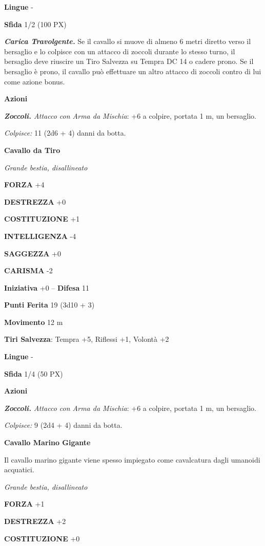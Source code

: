 \begin{multicols}{2}
\textbf{Lingue} -

\textbf{Sfida} 1/2 (100 PX)

\textit{\textbf{Carica Travolgente.}} Se il cavallo si muove di almeno 6 metri diretto verso il bersaglio e lo colpisce con un attacco di zoccoli durante lo stesso turno, il bersaglio deve riuscire un Tiro Salvezza su Tempra DC 14 o cadere prono. Se il bersaglio è prono, il cavallo può effettuare un altro attacco di zoccoli contro di lui come azione bonus.

\textbf{Azioni}

\textit{\textbf{Zoccoli.} Attacco con Arma da Mischia}: +6 a colpire, portata 1 m, un bersaglio.

\textit{Colpisce:} 11 (2d6 + 4) danni da botta.

\medskip\textbf{Cavallo da Tiro}

\textit{Grande bestia, disallineato}

\textbf{FORZA} +4

\textbf{DESTREZZA} +0

\textbf{COSTITUZIONE} +1

\textbf{INTELLIGENZA} -4

\textbf{SAGGEZZA} +0

\textbf{CARISMA} -2

\textbf{Iniziativa} +0 -- \textbf{Difesa} 11

\textbf{Punti Ferita} 19 (3d10 + 3)

\textbf{Movimento} 12 m

\textbf{Tiri Salvezza}: Tempra +5, Riflessi +1, Volontà +2

\textbf{Lingue} -

\textbf{Sfida} 1/4 (50 PX)

\textbf{Azioni}

\textit{\textbf{Zoccoli.} Attacco con Arma da Mischia}: +6 a colpire, portata 1 m, un bersaglio.

\textit{Colpisce:} 9 (2d4 + 4) danni da botta.

\medskip\textbf{Cavallo Marino Gigante}

Il cavallo marino gigante viene spesso impiegato come cavalcatura dagli umanoidi acquatici.

\textit{Grande bestia, disallineato}

\textbf{FORZA} +1

\textbf{DESTREZZA} +2

\textbf{COSTITUZIONE} +0


\end{multicols}
